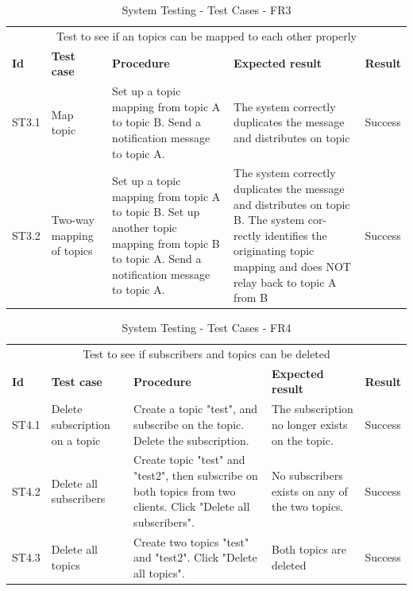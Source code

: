 \begin{table}[ht!]
\begin{tabular}{|m{1cm}|m{2cm}|m{4cm}|m{3cm}|m{1cm}|}
\hline
\rowcolor{lightgray}
\multicolumn{5}{|c|}{\textbf{FR3, Topic mapping}} \\ \hline
\multicolumn{5}{|c|}{{Test to see if an topics can be mapped to each other properly}} \\ \hline
\textbf{Id} & \textbf{Test case} & \textbf{Procedure} & \textbf{Expected result} & \textbf{Result} \\ \hline
ST3.1 & Map topic & Set up a topic mapping from topic A to topic B.
Send a notification message to topic A. & The  system  correctly  duplicates  the  message
and distributes on topic & Success \\ \hline
ST3.2 & Two-way mapping of topics & Set up a topic mapping from topic A to topic
B. Set up another topic mapping from topic B
to topic A. Send a notification message to topic
A. & The  system  correctly  duplicates  the  message
and  distributes  on  topic  B.  The  system  cor-
rectly identifies the originating topic mapping
and does NOT relay back to topic A from B & Success \\ \hline

\end{tabular}
\caption{System Testing - Test Cases - FR3}
\label{table:system-testing-cases-fr3}
\end{table}


\begin{table}[ht!]
\begin{tabular}{|m{1cm}|m{2cm}|m{4cm}|m{3cm}|m{1cm}|}
\hline
\rowcolor{lightgray}
\multicolumn{5}{|c|}{\textbf{FR3, Edit subscription}} \\ \hline
\multicolumn{5}{|c|}{{Test to see if subscribers and topics can be deleted}} \\ \hline
\textbf{Id} & \textbf{Test case} & \textbf{Procedure} & \textbf{Expected result} & \textbf{Result} \\ \hline
ST4.1 & Delete subscription on a topic & Create a topic "test", and subscribe on the topic. Delete the subscription. & The subscription no longer exists on the topic. & Success \\ \hline
ST4.2 & Delete all subscribers & Create topic "test" and "test2", then subscribe on both topics from two clients. Click "Delete all subscribers". & No subscribers exists on any of the two topics. & Success \\ \hline
ST4.3 & Delete all topics & Create two topics "test" and "test2". Click "Delete all topics". & Both topics are deleted & Success \\ \hline

\end{tabular}
\caption{System Testing - Test Cases - FR4}
\label{table:system-testing-cases-fr4}
\end{table}

